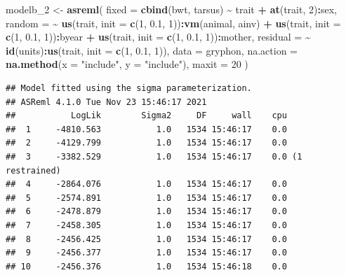 \documentclass[
  12pt,
]{book}
\newenvironment{Shaded}{\begin{snugshade}}{\end{snugshade}}
\newcommand{\DataTypeTok}[1]{\textcolor[rgb]{0.13,0.29,0.53}{#1}}
\newcommand{\DecValTok}[1]{\textcolor[rgb]{0.00,0.00,0.81}{#1}}
\newcommand{\FloatTok}[1]{\textcolor[rgb]{0.00,0.00,0.81}{#1}}
\newcommand{\KeywordTok}[1]{\textcolor[rgb]{0.13,0.29,0.53}{\textbf{#1}}}
\newcommand{\NormalTok}[1]{#1}
\newcommand{\OperatorTok}[1]{\textcolor[rgb]{0.81,0.36,0.00}{\textbf{#1}}}
\newcommand{\StringTok}[1]{\textcolor[rgb]{0.31,0.60,0.02}{#1}}
\begin{document}
\begin{Shaded}
\begin{Highlighting}[]
\NormalTok{modelb\_}\DecValTok{2}\NormalTok{ \textless{}{-}}\StringTok{ }\KeywordTok{asreml}\NormalTok{(}
  \DataTypeTok{fixed =} \KeywordTok{cbind}\NormalTok{(bwt, tarsus) }\OperatorTok{\textasciitilde{}}\StringTok{ }\NormalTok{trait }\OperatorTok{+}\StringTok{ }\KeywordTok{at}\NormalTok{(trait, }\DecValTok{2}\NormalTok{)}\OperatorTok{:}\NormalTok{sex,}
  \DataTypeTok{random =} \OperatorTok{\textasciitilde{}}\StringTok{ }\KeywordTok{us}\NormalTok{(trait, }\DataTypeTok{init =} \KeywordTok{c}\NormalTok{(}\DecValTok{1}\NormalTok{, }\FloatTok{0.1}\NormalTok{, }\DecValTok{1}\NormalTok{))}\OperatorTok{:}\KeywordTok{vm}\NormalTok{(animal, ainv) }\OperatorTok{+}
\StringTok{    }\KeywordTok{us}\NormalTok{(trait, }\DataTypeTok{init =} \KeywordTok{c}\NormalTok{(}\DecValTok{1}\NormalTok{, }\FloatTok{0.1}\NormalTok{, }\DecValTok{1}\NormalTok{))}\OperatorTok{:}\NormalTok{byear }\OperatorTok{+}
\StringTok{    }\KeywordTok{us}\NormalTok{(trait, }\DataTypeTok{init =} \KeywordTok{c}\NormalTok{(}\DecValTok{1}\NormalTok{, }\FloatTok{0.1}\NormalTok{, }\DecValTok{1}\NormalTok{))}\OperatorTok{:}\NormalTok{mother,}
  \DataTypeTok{residual =} \OperatorTok{\textasciitilde{}}\StringTok{ }\KeywordTok{id}\NormalTok{(units)}\OperatorTok{:}\KeywordTok{us}\NormalTok{(trait, }\DataTypeTok{init =} \KeywordTok{c}\NormalTok{(}\DecValTok{1}\NormalTok{, }\FloatTok{0.1}\NormalTok{, }\DecValTok{1}\NormalTok{)),}
  \DataTypeTok{data =}\NormalTok{ gryphon,}
  \DataTypeTok{na.action =} \KeywordTok{na.method}\NormalTok{(}\DataTypeTok{x =} \StringTok{"include"}\NormalTok{, }\DataTypeTok{y =} \StringTok{"include"}\NormalTok{),}
  \DataTypeTok{maxit =} \DecValTok{20}
\NormalTok{)}
\end{Highlighting}
\end{Shaded}

\begin{verbatim}
## Model fitted using the sigma parameterization.
## ASReml 4.1.0 Tue Nov 23 15:46:17 2021
##           LogLik        Sigma2     DF     wall    cpu
##  1     -4810.563           1.0   1534 15:46:17    0.0
##  2     -4129.799           1.0   1534 15:46:17    0.0
##  3     -3382.529           1.0   1534 15:46:17    0.0 (1 restrained)
##  4     -2864.076           1.0   1534 15:46:17    0.0
##  5     -2574.891           1.0   1534 15:46:17    0.0
##  6     -2478.879           1.0   1534 15:46:17    0.0
##  7     -2458.305           1.0   1534 15:46:17    0.0
##  8     -2456.425           1.0   1534 15:46:17    0.0
##  9     -2456.377           1.0   1534 15:46:17    0.0
## 10     -2456.376           1.0   1534 15:46:18    0.0
\end{verbatim}
\end{document}
